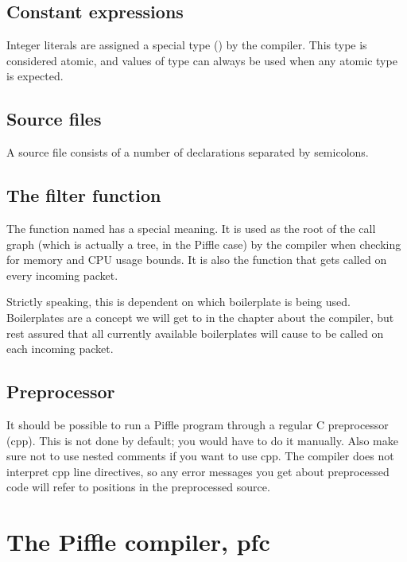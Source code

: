 \documentclass[a4paper,12pt]{scrreprt}
\begin{document}
\section{Constant expressions}

Integer literals are assigned a special type () by the
compiler. This type is considered atomic, and values of type
 can always be used when any atomic type is expected. 


\section{Source files}

A source file consists of a number of declarations separated by
semicolons.


\section{The filter function}

The function named  has a special meaning.  It is used as
the root of the call graph (which is actually a tree, in the Piffle
case) by the compiler when checking for memory and CPU usage bounds.
It is also the function that gets called on every incoming packet.

Strictly speaking, this is dependent on which boilerplate is being
used. Boilerplates are a concept we will get to in the chapter about
the compiler, but rest assured that all currently available
boilerplates will cause  to be called on each incoming
packet.


\section{Preprocessor}

It should be possible to run a Piffle program through a regular C
preprocessor (cpp). This is not done by default; you would have to do
it manually. Also make sure not to use nested comments if you want to
use cpp. The compiler does not interpret cpp line directives, so any
error messages you get about preprocessed code will refer to positions
in the preprocessed source.

\chapter{The Piffle compiler, pfc}
\end{document}
